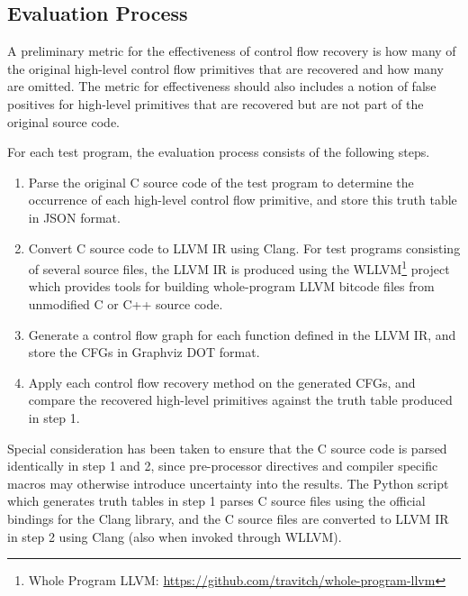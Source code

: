 
\subsection{Evaluation Process}
\label{sec:evaluation_process}


A preliminary metric for the effectiveness of control flow recovery is how many of the original high-level control flow primitives that are recovered and how many are omitted. The metric for effectiveness should also includes a notion of false positives for high-level primitives that are recovered but are not part of the original source code.

For each test program, the evaluation process consists of the following steps.

\begin{enumerate}
	\item \label{itm:step_c_to_json} Parse the original C source code of the test program to determine the occurrence of each high-level control flow primitive, and store this truth table in JSON format.
	\item \label{itm:step_c_to_ll} Convert C source code to LLVM IR using Clang. For test programs consisting of several source files, the LLVM IR is produced using the WLLVM\footnote{Whole Program LLVM: \url{https://github.com/travitch/whole-program-llvm}} project which provides tools for building whole-program LLVM bitcode files from unmodified C or C++ source code.
	\item \label{itm:step_ll_to_dot} Generate a control flow graph for each function defined in the LLVM IR, and store the CFGs in Graphviz DOT format.
	\item \label{itm:step_dot_to_json} Apply each control flow recovery method on the generated CFGs, and compare the recovered high-level primitives against the truth table produced in step 1.
\end{enumerate}

Special consideration has been taken to ensure that the C source code is parsed identically in step 1 and 2, since pre-processor directives and compiler specific macros may otherwise introduce uncertainty into the results. The Python script which generates truth tables in step 1 parses C source files using the official bindings for the Clang library, and the C source files are converted to LLVM IR in step 2 using Clang (also when invoked through WLLVM).

